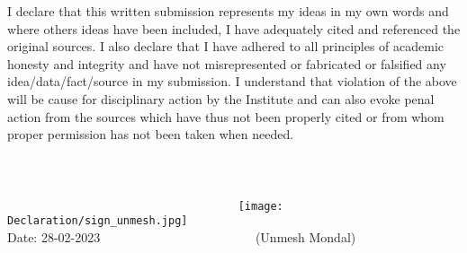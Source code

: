 

\begin{declaration}        %
I declare that this written submission represents my ideas in my own words and where others ideas have been included, I have adequately cited and referenced the original sources. I also declare that I have adhered to all principles of academic honesty and integrity and have not misrepresented or fabricated or falsified any idea/data/fact/source in my submission. I understand that violation of the above will be cause for disciplinary action by the Institute and can also evoke penal action from the sources which have thus not been properly cited or from whom proper permission has not been taken when needed.
\\
\\
\\
\\
${\qquad \qquad \qquad \qquad \qquad \qquad \qquad \qquad \qquad}$   \texttt{[image: Declaration/sign\_unmesh.jpg]} \\
Date: 28-02-2023 ${\qquad \qquad \qquad \qquad \qquad \qquad}$(Unmesh Mondal)
\end{declaration}
